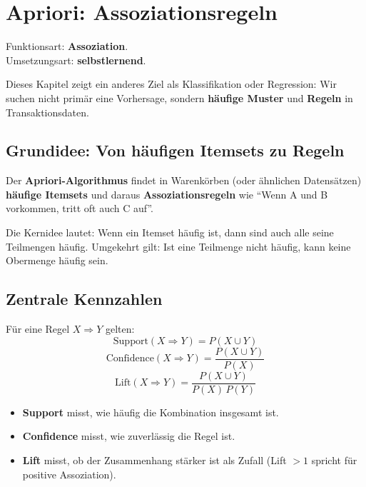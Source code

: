 \chapter{Apriori: Assoziationsregeln}
\label{chap:apriori}

\begin{myremark}
Funktionsart: \textbf{Assoziation}. \\
Umsetzungsart: \textbf{selbstlernend}.
\end{myremark}

\begin{myremark}
Dieses Kapitel zeigt ein anderes Ziel als Klassifikation oder Regression:
Wir suchen nicht primär eine Vorhersage, sondern \textbf{häufige Muster} und \textbf{Regeln}
in Transaktionsdaten.
\end{myremark}

\section{Grundidee: Von häufigen Itemsets zu Regeln}

\begin{mydefinition}[Apriori]
Der \textbf{Apriori-Algorithmus} findet in Warenkörben (oder ähnlichen Datensätzen)
\textbf{häufige Itemsets} und daraus \textbf{Assoziationsregeln} wie
\enquote{Wenn A und B vorkommen, tritt oft auch C auf}.

Die Kernidee lautet: Wenn ein Itemset häufig ist, dann sind auch alle seine Teilmengen häufig.
Umgekehrt gilt: Ist eine Teilmenge nicht häufig, kann keine Obermenge häufig sein.
\end{mydefinition}

\section{Zentrale Kennzahlen}

Für eine Regel $X \Rightarrow Y$ gelten:
\[
\text{Support}(X \Rightarrow Y) = P(X \cup Y)
\]
\[
\text{Confidence}(X \Rightarrow Y) = \frac{P(X \cup Y)}{P(X)}
\]
\[
\text{Lift}(X \Rightarrow Y) = \frac{P(X \cup Y)}{P(X)\,P(Y)}
\]

\begin{itemize}
    \item \textbf{Support} misst, wie häufig die Kombination insgesamt ist.
    \item \textbf{Confidence} misst, wie zuverlässig die Regel ist.
    \item \textbf{Lift} misst, ob der Zusammenhang stärker ist als Zufall
          (Lift $> 1$ spricht für positive Assoziation).
\end{itemize}

